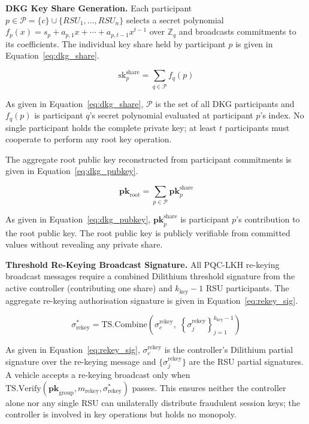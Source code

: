 \documentclass[12pt, a4paper]{report}
\newcommand{\mypar}{\vspace{0.8em}\noindent}
\begin{document}
\mypar
\textbf{DKG Key Share Generation.}
Each participant $p \in \mathcal{P} = \{c\} \cup
\{RSU_1, \ldots, RSU_n\}$ selects a secret polynomial
$f_p(x) = s_p + a_{p,1}x + \cdots + a_{p,t-1}x^{t-1}$
over $\mathbb{Z}_q$ and broadcasts commitments to its
coefficients. The individual key share held by participant $p$ is
given in Equation~\eqref{eq:dkg_share}.

\begin{equation}
\label{eq:dkg_share}
\mathrm{sk}_p^{\text{share}} =
\sum_{q \in \mathcal{P}} f_q(p)
\end{equation}

As given in Equation~\eqref{eq:dkg_share}, $\mathcal{P}$ is the
set of all DKG participants and $f_q(p)$ is participant $q$'s
secret polynomial evaluated at participant $p$'s index. No single
participant holds the complete private key; at least $t$
participants must cooperate to perform any root key operation.

The aggregate root public key reconstructed from participant
commitments is given in Equation~\eqref{eq:dkg_pubkey}.

\begin{equation}
\label{eq:dkg_pubkey}
\mathbf{pk}_{\text{root}} =
\sum_{p \in \mathcal{P}} \mathbf{pk}_p^{\text{share}}
\end{equation}

As given in Equation~\eqref{eq:dkg_pubkey},
$\mathbf{pk}_p^{\text{share}}$ is participant $p$'s contribution
to the root public key. The root public key is publicly verifiable
from committed values without revealing any private share.

\mypar
\textbf{Threshold Re-Keying Broadcast Signature.}
All PQC-LKH re-keying broadcast messages require a combined
Dilithium threshold signature from the active controller
(contributing one share) and $k_{\text{key}}-1$ RSU participants.
The aggregate re-keying authorisation signature is given in
Equation~\eqref{eq:rekey_sig}.

\begin{equation}
\label{eq:rekey_sig}
\sigma_{\text{rekey}}^* =
\mathrm{TS.Combine}\!\left(
\sigma_c^{\text{rekey}},\;
\left\{\sigma_j^{\text{rekey}}\right\}_{j=1}^{k_{\text{key}}-1}
\right)
\end{equation}

As given in Equation~\eqref{eq:rekey_sig},
$\sigma_c^{\text{rekey}}$ is the controller's Dilithium partial
signature over the re-keying message and
$\{\sigma_j^{\text{rekey}}\}$ are the RSU partial signatures.
A vehicle accepts a re-keying broadcast only when
$\mathrm{TS.Verify}(\mathbf{pk}_{\text{group}}, m_{\text{rekey}},
\sigma_{\text{rekey}}^*)$ passes. This ensures neither the
controller alone nor any single RSU can unilaterally distribute
fraudulent session keys; the controller is involved in key
operations but holds no monopoly.
\end{document}
